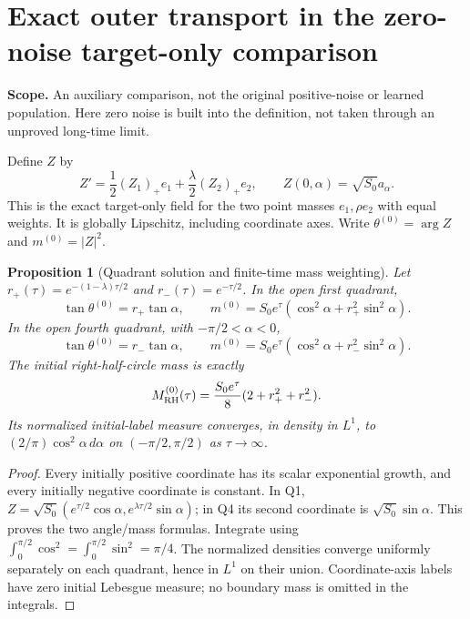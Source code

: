 \documentclass[11pt]{article}
\numberwithin{equation}{section}
\newtheorem{proposition}[theorem]{Proposition}
\theoremstyle{remark}\newtheorem{remark}[theorem]{Remark}
\newcommand{\dd}{\,d}
\newcommand{\1}{\mathbf 1}
\newcommand{\scope}[1]{\par\noindent\textbf{Scope.} #1\par\smallskip}
\begin{document}
\section{Exact outer transport in the zero-noise target-only comparison}
\label{inc:AN02:tail:v1:outer}
\scope{An auxiliary comparison, not the original positive-noise or learned
population. Here zero noise is built into the definition, not taken through
an unproved long-time limit.}
Define $Z$ by
\begin{equation}\label{inc:AN02:tail:v1:zerofield}
 Z'=\frac12(Z_1)_+e_1+\frac\lambda2(Z_2)_+e_2,
 \qquad Z(0,\alpha)=\sqrt{S_0}a_\alpha.
\end{equation}
This is the exact target-only field for the two point masses
$e_1,\rho e_2$ with equal weights. It is globally Lipschitz, including
coordinate axes. Write $\theta^{(0)}=\arg Z$ and $m^{(0)}=|Z|^2$.

\begin{proposition}[Quadrant solution and finite-time mass weighting]
\label{inc:AN02:tail:v1:quadrants}
Let $r_+(\tau)=e^{-(1-\lambda)\tau/2}$ and
$r_-(\tau)=e^{-\tau/2}$. In the open first quadrant,
\begin{equation}\label{inc:AN02:tail:v1:Q1}
 \tan\theta^{(0)}=r_+\tan\alpha,\qquad
 m^{(0)}=S_0e^\tau(\cos^2\alpha+r_+^2\sin^2\alpha).
\end{equation}
In the open fourth quadrant, with $-\pi/2<\alpha<0$,
\begin{equation}\label{inc:AN02:tail:v1:Q4}
 \tan\theta^{(0)}=r_-\tan\alpha,\qquad
 m^{(0)}=S_0e^\tau(\cos^2\alpha+r_-^2\sin^2\alpha).
\end{equation}
The initial right-half-circle mass is exactly
\begin{equation}\label{inc:AN02:tail:v1:rightmass}
 M_{\rm RH}^{(0)}(\tau)=\frac{S_0e^\tau}{8}(2+r_+^2+r_-^2).
\end{equation}
Its normalized initial-label measure converges, in density in $L^1$, to
$(2/\pi)\cos^2\alpha\dd\alpha$ on $(-\pi/2,\pi/2)$ as $\tau\to\infty$.
\end{proposition}
\begin{proof}
Every initially positive coordinate has its scalar exponential growth, and
every initially negative coordinate is constant. In Q1,
$Z=\sqrt{S_0}(e^{\tau/2}\cos\alpha,e^{\lambda\tau/2}\sin\alpha)$;
in Q4 its second coordinate is $\sqrt{S_0}\sin\alpha$.
This proves the two angle/mass formulas. Integrate using
$\int_0^{\pi/2}\cos^2=\int_0^{\pi/2}\sin^2=\pi/4$.
The normalized densities converge uniformly separately on each quadrant,
hence in $L^1$ on their union. Coordinate-axis labels have zero initial
Lebesgue measure; no boundary mass is omitted in the integrals.
\end{proof}
\end{document}
